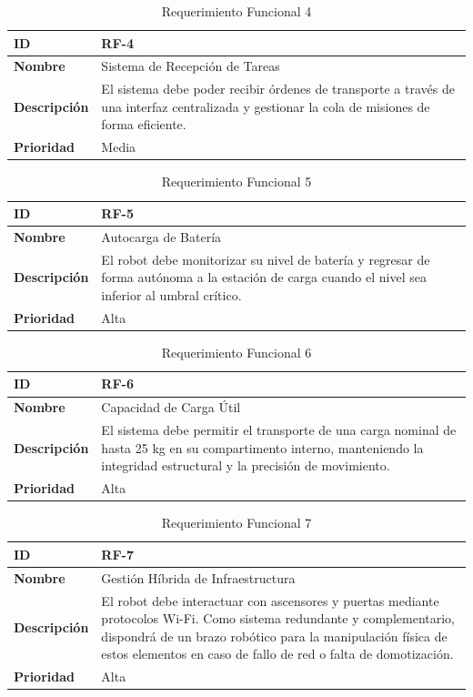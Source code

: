 \begin{table}[H]
\centering
\begin{tabular}{|l|p{10cm}|}
\hline
\textbf{ID} & RF-4 \\ \hline
\textbf{Nombre} & Sistema de Recepción de Tareas \\ \hline
\textbf{Descripción} & El sistema debe poder recibir órdenes de transporte a través de una interfaz centralizada y gestionar la cola de misiones de forma eficiente. \\ \hline
\textbf{Prioridad} & Media \\ \hline
\end{tabular}
\caption{Requerimiento Funcional 4}
\end{table}

\begin{table}[H]
\centering
\begin{tabular}{|l|p{10cm}|}
\hline
\textbf{ID} & RF-5 \\ \hline
\textbf{Nombre} & Autocarga de Batería \\ \hline
\textbf{Descripción} & El robot debe monitorizar su nivel de batería y regresar de forma autónoma a la estación de carga cuando el nivel sea inferior al umbral crítico. \\ \hline
\textbf{Prioridad} & Alta \\ \hline
\end{tabular}
\caption{Requerimiento Funcional 5}
\end{table}

\begin{table}[H]
\centering
\begin{tabular}{|l|p{10cm}|}
\hline
\textbf{ID} & RF-6 \\ \hline
\textbf{Nombre} & Capacidad de Carga Útil \\ \hline
\textbf{Descripción} & El sistema debe permitir el transporte de una carga nominal de hasta 25 kg en su compartimento interno, manteniendo la integridad estructural y la precisión de movimiento. \\ \hline
\textbf{Prioridad} & Alta \\ \hline
\end{tabular}
\caption{Requerimiento Funcional 6}
\end{table}

\begin{table}[H]
\centering
\begin{tabular}{|l|p{10cm}|}
\hline
\textbf{ID} & RF-7 \\ \hline
\textbf{Nombre} & Gestión Híbrida de Infraestructura \\ \hline
\textbf{Descripción} & El robot debe interactuar con ascensores y puertas mediante protocolos Wi-Fi. Como sistema redundante y complementario, dispondrá de un brazo robótico para la manipulación física de estos elementos en caso de fallo de red o falta de domotización. \\ \hline
\textbf{Prioridad} & Alta \\ \hline
\end{tabular}
\caption{Requerimiento Funcional 7}
\end{table}

